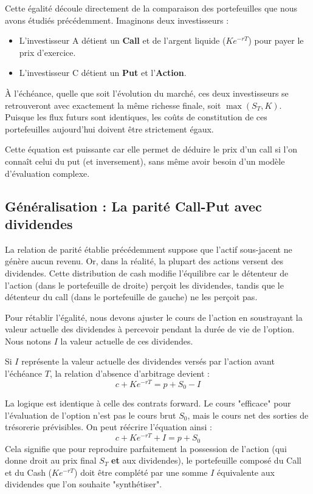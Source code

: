 \begin{intuitionbox}
Cette égalité découle directement de la comparaison des portefeuilles que nous avons étudiés précédemment.
Imaginons deux investisseurs :
\begin{itemize}
    \item L'investisseur A détient un \textbf{Call} et de l'argent liquide ($Ke^{-rT}$) pour payer le prix d'exercice.
    \item L'investisseur C détient un \textbf{Put} et l'\textbf{Action}.
\end{itemize}
À l'échéance, quelle que soit l'évolution du marché, ces deux investisseurs se retrouveront avec exactement la même richesse finale, soit $\max(S_T, K)$. Puisque les flux futurs sont identiques, les coûts de constitution de ces portefeuilles aujourd'hui doivent être strictement égaux.

Cette équation est puissante car elle permet de déduire le prix d'un call si l'on connaît celui du put (et inversement), sans même avoir besoin d'un modèle d'évaluation complexe.
\end{intuitionbox}

\subsection{Généralisation : La parité Call-Put avec dividendes}

La relation de parité établie précédemment suppose que l'actif sous-jacent ne génère aucun revenu. Or, dans la réalité, la plupart des actions versent des dividendes. Cette distribution de cash modifie l'équilibre car le détenteur de l'action (dans le portefeuille de droite) perçoit les dividendes, tandis que le détenteur du call (dans le portefeuille de gauche) ne les perçoit pas.

Pour rétablir l'égalité, nous devons ajuster le cours de l'action en soustrayant la valeur actuelle des dividendes à percevoir pendant la durée de vie de l'option. Nous notons $I$ la valeur actuelle de ces dividendes.

\begin{theorembox}
Si $I$ représente la valeur actuelle des dividendes versés par l'action avant l'échéance $T$, la relation d'absence d'arbitrage devient :
$$ c + Ke^{-rT} = p + S_0 - I $$
\end{theorembox}

\begin{intuitionbox}
La logique est identique à celle des contrats forward. Le cours "efficace" pour l'évaluation de l'option n'est pas le cours brut $S_0$, mais le cours net des sorties de trésorerie prévisibles.
On peut réécrire l'équation ainsi :
$$ c + Ke^{-rT} + I = p + S_0 $$
Cela signifie que pour reproduire parfaitement la possession de l'action (qui donne droit au prix final $S_T$ \textbf{et} aux dividendes), le portefeuille composé du Call et du Cash ($Ke^{-rT}$) doit être complété par une somme $I$ équivalente aux dividendes que l'on souhaite "synthétiser".
\end{intuitionbox}